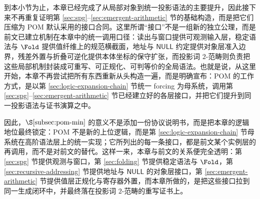 到本小节为止，本章已经完成了从局部对象到统一投影语法的主要提升，因此接下来不再重复证明第 \ref{sec:spg}--\ref{sec:emergent-arithmetic} 节的基础构造，而是把它们压缩为 POM 默认采用的接口合同。这里所谓“接口”不是一组新的独立公理，而是前文已建立机制在本章中的统一调用口径：读出与窗口提供可观测输入层，稳定语法与 \(\Fold\) 提供值纤维上的规范横截面，地址与 \(\mathsf{NULL}\) 约定提供对象层准入边界，残差外置与折叠可逆化提供本体坐标的保守扩张，而投影词 \(2\)-范畴则负责把这些局部机制封装成可重写、可正规化、可判等价的全局语法。也就是说，从这里开始，本章不再尝试把所有东西重新从头构造一遍，而是明确宣布：POM 的工作方式，是以第 \ref{sec:logic-expansion-chain} 节统一 forcing 为母系统，调用第 \ref{sec:spg}--\ref{sec:emergent-arithmetic} 节已经建立好的各层接口，并把它们提升到同一投影语法与证书演算之中。

因此，\(\S\ref{subsec:pom-min}\) 的意义不是添加一份协议说明书，而是把本章的逻辑地位最终锁定：POM 不是新的上位逻辑，而是第 \ref{sec:logic-expansion-chain} 节母系统在高阶语法层上的统一实现；它所列出的每一条接口，都是前文某个实例层的再调用，而不是对前文的替代。这样一来，本章与前文的关系便完全透明：第 \ref{sec:spg} 节提供观测与窗口，第 \ref{sec:folding} 节提供稳定语法与 \(\Fold\)，第 \ref{sec:recursive-addressing} 节提供地址与 \(\mathsf{NULL}\) 的对象层接口，第 \ref{sec:emergent-arithmetic} 节提供值层正规化与寄存器外置，而本章所做的，是把这些接口拉到同一生成闭环中，并最终落在投影词 \(2\)-范畴的重写证书上。

